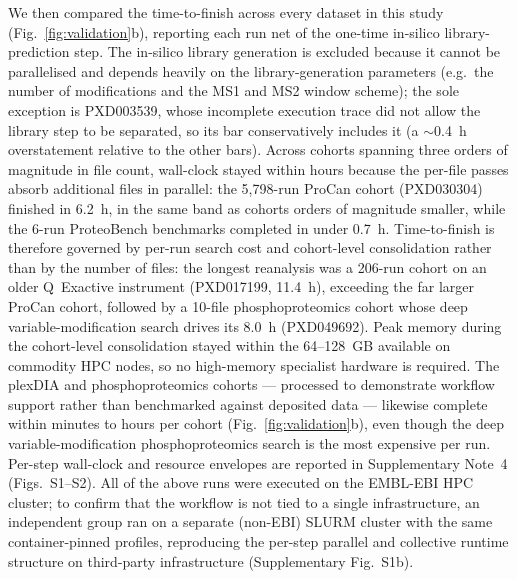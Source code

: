 \documentclass[preprint,12pt]{elsarticle}
\begin{document}
We then compared the time-to-finish across every dataset in this study (Fig.~\ref{fig:validation}b), reporting each run net of the one-time in-silico library-prediction step. The in-silico library generation is excluded because it cannot be parallelised and depends heavily on the library-generation parameters (e.g.\ the number of modifications and the MS1 and MS2 window scheme); the sole exception is PXD003539, whose incomplete execution trace did not allow the library step to be separated, so its bar conservatively includes it (a $\sim$0.4~h overstatement relative to the other bars). Across cohorts spanning three orders of magnitude in file count, wall-clock stayed within hours because the per-file passes absorb additional files in parallel: the 5{,}798-run ProCan cohort (PXD030304) finished in 6.2~h, in the same band as cohorts orders of magnitude smaller, while the 6-run ProteoBench benchmarks completed in under 0.7~h. Time-to-finish is therefore governed by per-run search cost and cohort-level consolidation rather than by the number of files: the longest reanalysis was a 206-run cohort on an older Q~Exactive instrument (PXD017199, 11.4~h), exceeding the far larger ProCan cohort, followed by a 10-file phosphoproteomics cohort whose deep variable-modification search drives its 8.0~h (PXD049692). Peak memory during the cohort-level consolidation stayed within the 64--128~GB available on commodity HPC nodes, so no high-memory specialist hardware is required. The plexDIA and phosphoproteomics cohorts --- processed to demonstrate workflow support rather than benchmarked against deposited data --- likewise complete within minutes to hours per cohort (Fig.~\ref{fig:validation}b), even though the deep variable-modification phosphoproteomics search is the most expensive per run. Per-step wall-clock and resource envelopes are reported in Supplementary Note~4 (Figs.~S1--S2). All of the above runs were executed on the EMBL-EBI HPC cluster; to confirm that the workflow is not tied to a single infrastructure, an independent group ran \quantmsdiann{} on a separate (non-EBI) SLURM cluster with the same container-pinned profiles, reproducing the per-step parallel and collective runtime structure on third-party infrastructure (Supplementary Fig.~S1b).
\end{document}
